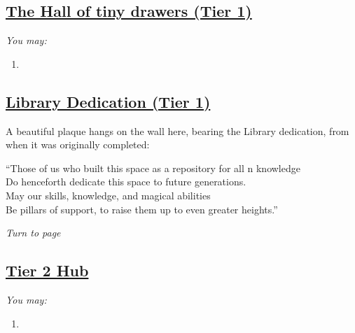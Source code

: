 \documentclass[sheet]{GL2020}
\begin{document}
\clearpage

\begin{center}\section*{\underline{The Hall of tiny drawers (Tier 1)}}\end{center}
\label{HallofTinyDrawers}

\begingroup
\itshape
You may:
\begin{enumerate}[A]
  \item 
\end{enumerate}
\endgroup

\clearpage

\begin{center}\section*{\underline{Library Dedication (Tier 1)}}\end{center}
\label{LibraryDedication}

A beautiful plaque hangs on the wall here, bearing the Library dedication, from when it was originally completed:

\begin{center}
``Those of us who built this space as a repository for all \pEarth{}n knowledge\\
Do henceforth dedicate this space to future generations.\\

May our skills, knowledge, and magical abilities\\
Be pillars of support, to raise them up to even greater heights.''\\
\end{center}

\emph{Turn to page~\pageref{TierOneHub}}

\clearpage



\begin{center}\section*{\underline{Tier 2 Hub}}\end{center}
\label{TierTwoHub}

\begingroup
\itshape
You may:
\begin{enumerate}[A]
  \item 
\end{enumerate}
\endgroup
\end{document}
